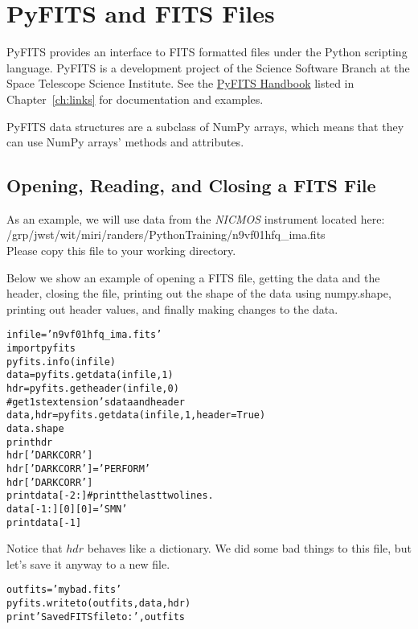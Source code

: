 \chapter{PyFITS and FITS Files}
\label{ch:pyfits}
PyFITS provides an interface to FITS formatted files under the Python
scripting language.  PyFITS is a development project of the Science
Software Branch at the Space Telescope Science Institute.  See the 
\href{http://stsdas.stsci.edu/download/wikidocs/The_PyFITS_Handbook.pdf}{PyFITS Handbook}
listed in Chapter~\ref{ch:links} for documentation and
examples.

PyFITS data structures are a subclass of NumPy arrays, which means
that they can use NumPy arrays' methods and attributes.
 
\section{Opening, Reading, and Closing a FITS File }
As an example, we will use data from the \emph{NICMOS} instrument located here:  \\
/grp/jwst/wit/miri/randers/PythonTraining/n9vf01hfq\_ima.fits \\ 
Please copy this file to your working directory. 

Below we show an example of opening a FITS file, getting
the data and the header, closing the file, printing out the shape of
the data using {\sf \small numpy.shape}, printing out header values,
and finally making changes to the data.

\begin{alltt}
\pytab infile = 'n9vf01hfq_ima.fits'
\pytab import pyfits 
\pytab pyfits.info(infile)
\pytab data = pyfits.getdata(infile,1) 
\pytab hdr = pyfits.getheader(infile,0) 
# get 1st extension's data and header 
\pytab data, hdr = pyfits.getdata(infile, 1, header=True)
\pytab data.shape
\pytab print hdr 
\pytab hdr['DARKCORR'] 
\pytab hdr['DARKCORR'] = 'PERFORM'
\pytab hdr['DARKCORR']
\pytab print data[-2:]  #print the last two lines.
\pytab data[-1:][0][0] = 'SMN'
\pytab print data[-1]
\end{alltt}

Notice that $hdr$ behaves like a dictionary.  We did some
bad things to this file, but let's save it anyway to a new file.

\begin{alltt}
\pytab outfits = 'mybad.fits'
\pytab pyfits.writeto(outfits, data, hdr)
\pytab print 'Saved FITS file to: ',outfits
\end{alltt}

